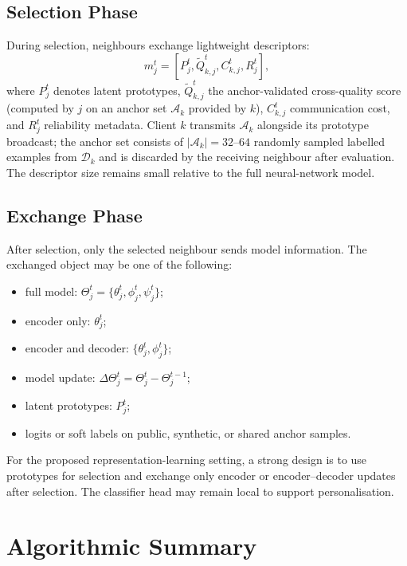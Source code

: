 \documentclass[conference]{IEEEtran}
\begin{document}
\subsection{Selection Phase}
\label{subsec:selection-phase}
During selection, neighbours exchange lightweight descriptors:
\begin{equation}
    m_j^t = [P_j^t, \tilde{Q}_{k,j}^t, C_{k,j}^t, R_j^t],
    \label{eq:auto-034}
\end{equation}
where \(P_j^t\) denotes latent prototypes, \(\tilde{Q}_{k,j}^t\) the anchor-validated cross-quality score (computed by \(j\) on an anchor set \(\mathcal{A}_k\) provided by \(k\)), \(C_{k,j}^t\) communication cost, and \(R_j^t\) reliability metadata. Client \(k\) transmits \(\mathcal{A}_k\) alongside its prototype broadcast; the anchor set consists of \(|\mathcal{A}_k| = 32\)--\(64\) randomly sampled labelled examples from \(\mathcal{D}_k\) and is discarded by the receiving neighbour after evaluation. The descriptor size remains small relative to the full neural-network model.

\subsection{Exchange Phase}
\label{subsec:exchange-phase}
After selection, only the selected neighbour sends model information. The exchanged object may be one of the following:
\begin{itemize}
    \item full model: \(\Theta_j^t=\{\theta_j^t,\phi_j^t,\psi_j^t\}\);
    \item encoder only: \(\theta_j^t\);
    \item encoder and decoder: \(\{\theta_j^t,\phi_j^t\}\);
    \item model update: \(\Delta\Theta_j^t=\Theta_j^t-\Theta_j^{t-1}\);
    \item latent prototypes: \(P_j^t\);
    \item logits or soft labels on public, synthetic, or shared anchor samples.
\end{itemize}

For the proposed representation-learning setting, a strong design is to use prototypes for selection and exchange only encoder or encoder--decoder updates after selection. The classifier head may remain local to support personalisation.

\section{Algorithmic Summary}
\label{sec:algorithm}
\end{document}

